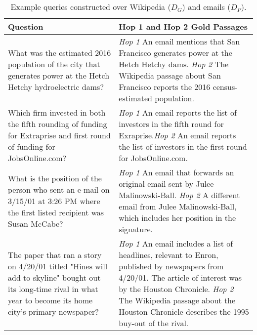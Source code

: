 \documentclass{article}
\begin{document}
\begin{table*}[t]
\small
\begin{tabular}{p{5.3cm}p{9.8cm}}
\toprule
Question & Hop 1 and Hop 2 Gold Passages  \\
\midrule
What was the estimated 2016 population of the city that generates power at the Hetch Hetchy hydroelectric dams? &
\textit{Hop 1} An email mentions that San Francisco generates power at the Hetch Hetchy dams. \newline \textit{Hop 2} The Wikipedia passage about San Francisco reports the 2016 census-estimated population.
\\
\midrule
Which firm invested in both the fifth rounding of funding for Extraprise and first round of funding for JobsOnline.com? & 
\textit{Hop 1} An email reports the list of investors in the fifth round for Exraprise.\newline \textit{Hop 2} An email reports the list of investors in the first round for JobsOnline.com. 
\\
\midrule
What is the position of the person who sent an e-mail on 3/15/01 at 3:26 PM where the first listed recipient was Susan McCabe? &
\textit{Hop 1} An email that forwards an original email sent by Julee Malinowski-Ball.\newline
\textit{Hop 2} A different email from Julee Malinowski-Ball, which includes her position in the signature. \\
\midrule
The paper that ran a story on 4/20/01 titled "Hines will add to skyline" bought out its long-time rival in what year to become its home city's primary newspaper? &
\textit{Hop 1} An email includes a list of headlines, relevant to Enron, published by newspapers from 4/20/01. The article of interest was by the Houston Chronicle. \newline
\textit{Hop 2} The Wikipedia passage about the Houston Chronicle describes the 1995 buy-out of the rival. \\
\bottomrule
\end{tabular}
\caption{Example queries constructed over Wikipedia (${D_G}$) and emails (${D_P}$). }
\label{tab:enron_demo_examples}
\end{table*}
\end{document}

